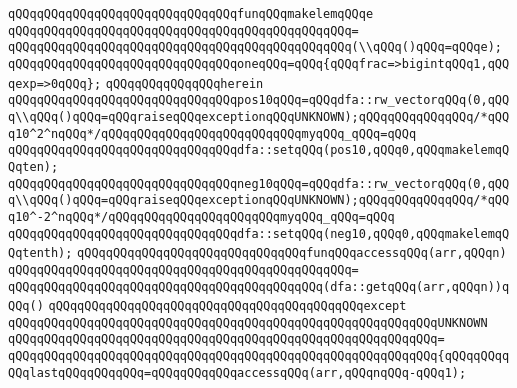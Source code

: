 \newline
\verb|qQQqqQQqqQQqqQQqqQQqqQQqqQQqqQQqfunqQQqmakelemqQQqe|\newline
\verb|qQQqqQQqqQQqqQQqqQQqqQQqqQQqqQQqqQQqqQQqqQQqqQQq=|\newline
\verb|qQQqqQQqqQQqqQQqqQQqqQQqqQQqqQQqqQQqqQQqqQQqqQQq(\\qQQq()qQQq=qQQqe);|\newline
\newline
\verb|qQQqqQQqqQQqqQQqqQQqqQQqqQQqqQQqoneqQQq=qQQq{qQQqfrac=>bigintqQQq1,qQQqexp=>0qQQq};|\newline
\newline
\verb|qQQqqQQqqQQqqQQqherein|\newline
\newline
\verb|qQQqqQQqqQQqqQQqqQQqqQQqqQQqqQQqpos10qQQq=qQQqdfa::rw_vectorqQQq(0,qQQq\\qQQq()qQQq=qQQqraiseqQQqexceptionqQQqUNKNOWN);qQQqqQQqqQQqqQQq/*qQQq10^2^nqQQq*/qQQqqQQqqQQqqQQqqQQqqQQqqQQqmyqQQq_qQQq=qQQq|\newline
\newline
\verb|qQQqqQQqqQQqqQQqqQQqqQQqqQQqqQQqdfa::setqQQq(pos10,qQQq0,qQQqmakelemqQQqten);|\newline
\newline
\verb|qQQqqQQqqQQqqQQqqQQqqQQqqQQqqQQqneg10qQQq=qQQqdfa::rw_vectorqQQq(0,qQQq\\qQQq()qQQq=qQQqraiseqQQqexceptionqQQqUNKNOWN);qQQqqQQqqQQqqQQq/*qQQq10^-2^nqQQq*/qQQqqQQqqQQqqQQqqQQqqQQqmyqQQq_qQQq=qQQq|\newline
\newline
\verb|qQQqqQQqqQQqqQQqqQQqqQQqqQQqqQQqdfa::setqQQq(neg10,qQQq0,qQQqmakelemqQQqtenth);|\newline
\newline
\verb|qQQqqQQqqQQqqQQqqQQqqQQqqQQqqQQqfunqQQqaccessqQQq(arr,qQQqn)|\newline
\verb|qQQqqQQqqQQqqQQqqQQqqQQqqQQqqQQqqQQqqQQqqQQqqQQq=|\newline
\verb|qQQqqQQqqQQqqQQqqQQqqQQqqQQqqQQqqQQqqQQqqQQq(dfa::getqQQq(arr,qQQqn))qQQq()|\newline
\verb|qQQqqQQqqQQqqQQqqQQqqQQqqQQqqQQqqQQqqQQqqQQqexcept|\newline
\verb|qQQqqQQqqQQqqQQqqQQqqQQqqQQqqQQqqQQqqQQqqQQqqQQqqQQqqQQqqQQqUNKNOWN|\newline
\verb|qQQqqQQqqQQqqQQqqQQqqQQqqQQqqQQqqQQqqQQqqQQqqQQqqQQqqQQqqQQq=|\newline
\verb|qQQqqQQqqQQqqQQqqQQqqQQqqQQqqQQqqQQqqQQqqQQqqQQqqQQqqQQqqQQq{qQQqqQQqqQQqlastqQQqqQQqqQQq=qQQqqQQqqQQqaccessqQQq(arr,qQQqnqQQq-qQQq1);|\newline
